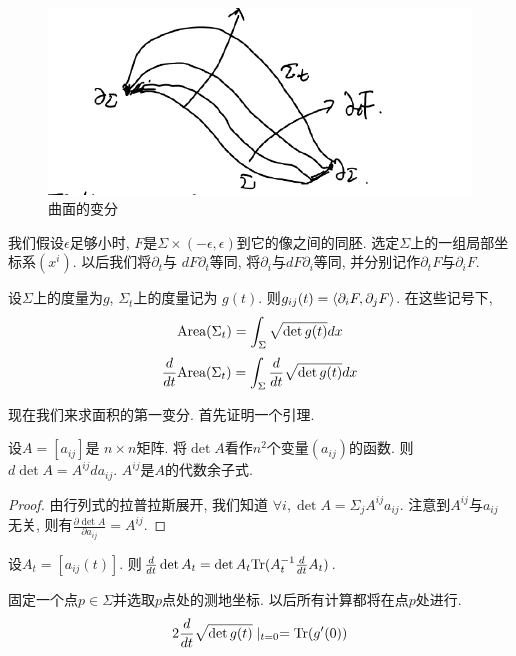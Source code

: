 \begin{figure}[ht]
	\centering
	\includegraphics[scale=0.8]{images/variation.png}
	\caption{曲面的变分}
	\label{variation_p}
\end{figure}


\begin{remark}
    我们假设$\epsilon$足够小时, $F$是$\Sigma \times (-\epsilon,\epsilon)$到它的像之间的同胚. 选定$\Sigma$上的一组局部坐标系$(x^i)$. 以后我们将$\partial_t$与 $dF\partial_t$等同, 将$\partial_i$与$dF\partial_i$等同, 并分别记作$\partial_t F$与$\partial_i F$.
\end{remark}
设$\Sigma$上的度量为$g$, $\Sigma_t$上的度量记为 $g(t)$. 则$g_{ij}(t)={\left < \partial_iF, \partial_jF \right >}$. 在这些记号下, 
\begin{equation}
    \text{Area}(\Sigma_t)=\int_\Sigma \sqrt{\det g(t)}dx
\end{equation}
\begin{equation}
    \frac{d}{dt} \text{Area}(\Sigma_t)=\int_\Sigma \frac{d}{dt} \sqrt{\det g(t)}dx
\end{equation}
\par 现在我们来求面积的第一变分. 首先证明一个引理.
\begin{lemma}
    设$A=[a_{ij}]$是 $n \times n$矩阵. 将$\det A$看作$n^2$个变量$(a_{ij})$的函数. 则$d\det A= A^{ij}da_{ij}$. $A^{ij}$是$A$的代数余子式.
\end{lemma}
\begin{proof}
    由行列式的拉普拉斯展开, 我们知道 $\forall i, \det A= \Sigma_{j}A^{ij}a_{ij}$. 注意到$A^{ij}$与${a_{ij}}$无关, 则有$\frac{\partial \det A}{\partial a_{ij}}=A^{ij}$.
\end{proof}
\begin{corollary} \label{det_jacobi}
    设$A_t=[a_{ij}(t)]$. 则$\frac{d}{dt} \det A_t=\det A_t {\text{Tr}}(A_t^{-1}\frac{d}{dt} A_t)$.
\end{corollary}
固定一个点$p \in \Sigma$并选取$p$点处的测地坐标. 以后所有计算都将在点$p$处进行.
\begin{equation}
    2\frac{d}{dt} \sqrt{\det g(t)}\mid_{t=0}={\text{Tr}}(g'(0))
\end{equation}

